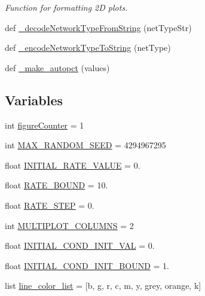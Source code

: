 \begin{DoxyCompactItemize}
\begin{DoxyCompactList}\small\item\em Function for formatting 2D plots. \end{DoxyCompactList}\item 
def \hyperlink{namespace_mu_mo_t_1_1_mu_mo_t_ac34bd5f10896d28b40c1eaaaab1dd66f}{\+\_\+decode\+Network\+Type\+From\+String} (net\+Type\+Str)
\item 
def \hyperlink{namespace_mu_mo_t_1_1_mu_mo_t_a49af3b04a254110f0064be6a95910533}{\+\_\+encode\+Network\+Type\+To\+String} (net\+Type)
\item 
def \hyperlink{namespace_mu_mo_t_1_1_mu_mo_t_a4820dd5a417c2c593d10deacd3dc1b03}{\+\_\+make\+\_\+autopct} (values)
\end{DoxyCompactItemize}
\subsection*{Variables}
\begin{DoxyCompactItemize}
\item 
int \hyperlink{namespace_mu_mo_t_1_1_mu_mo_t_a4543afee285a2aa1cd5c8c9ca14fe77f}{figure\+Counter} = 1
\item 
int \hyperlink{namespace_mu_mo_t_1_1_mu_mo_t_ae8957aab30c8ae3e6065cd19d166ef22}{M\+A\+X\+\_\+\+R\+A\+N\+D\+O\+M\+\_\+\+S\+E\+ED} = 4294967295
\item 
float \hyperlink{namespace_mu_mo_t_1_1_mu_mo_t_aa168c4a595cabfd7f2af95bcc8c8636f}{I\+N\+I\+T\+I\+A\+L\+\_\+\+R\+A\+T\+E\+\_\+\+V\+A\+L\+UE} = 0.
\item 
float \hyperlink{namespace_mu_mo_t_1_1_mu_mo_t_ad02e9bfc63846779b7b8c5aff0688879}{R\+A\+T\+E\+\_\+\+B\+O\+U\+ND} = 10.
\item 
float \hyperlink{namespace_mu_mo_t_1_1_mu_mo_t_a62b44f6ef63c58313e64af86a7219285}{R\+A\+T\+E\+\_\+\+S\+T\+EP} = 0.
\item 
int \hyperlink{namespace_mu_mo_t_1_1_mu_mo_t_a3911ed84a3973ff4c37bb3bd7d39f22d}{M\+U\+L\+T\+I\+P\+L\+O\+T\+\_\+\+C\+O\+L\+U\+M\+NS} = 2
\item 
float \hyperlink{namespace_mu_mo_t_1_1_mu_mo_t_a432a9028abe35796fd5f4d5b622a57e3}{I\+N\+I\+T\+I\+A\+L\+\_\+\+C\+O\+N\+D\+\_\+\+I\+N\+I\+T\+\_\+\+V\+AL} = 0.
\item 
float \hyperlink{namespace_mu_mo_t_1_1_mu_mo_t_af9f223568146eea48d8f53d7d513bb3d}{I\+N\+I\+T\+I\+A\+L\+\_\+\+C\+O\+N\+D\+\_\+\+I\+N\+I\+T\+\_\+\+B\+O\+U\+ND} = 1.
\item 
list \hyperlink{namespace_mu_mo_t_1_1_mu_mo_t_a0db937f6f99debbdebdfb40c196ddf36}{line\+\_\+color\+\_\+list} = \mbox{[}\textquotesingle{}b\textquotesingle{}, \textquotesingle{}g\textquotesingle{}, \textquotesingle{}r\textquotesingle{}, \textquotesingle{}c\textquotesingle{}, \textquotesingle{}m\textquotesingle{}, \textquotesingle{}y\textquotesingle{}, \textquotesingle{}grey\textquotesingle{}, \textquotesingle{}orange\textquotesingle{}, \textquotesingle{}k\textquotesingle{}\mbox{]}
\end{DoxyCompactItemize}


